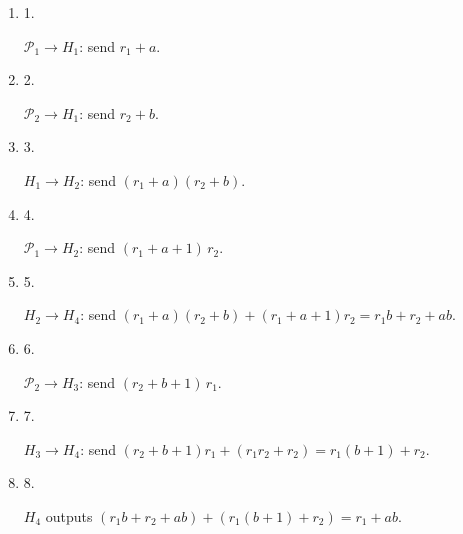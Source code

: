 \begin{enumerate}


\item[] 
1. 


$\mathcal{P}_{1}\rightarrow H_{1}$: send $r_{1}+a$.\par





\item[] 
2. 


$\mathcal{P}_{2}\rightarrow H_{1}$: send $r_{2}+b$.\par





\item[] 
3. 


$H_{1}\rightarrow H_{2}$: send $(r_{1}+a)(r_{2}+b)$.\par





\item[] 
4. 


$\mathcal{P}_{1}\rightarrow H_{2}$: send $(r_{1}+a+1)\,r_{2}$.\par





\item[] 
5. 


$H_{2}\rightarrow H_{4}$: send $(r_{1}+a)(r_{2}+b)+(r_{1}+a+1)r_{2}=r_{1}b+r_{2}+ab$.\par





\item[] 
6. 


$\mathcal{P}_{2}\rightarrow H_{3}$: send $(r_{2}+b+1)\,r_{1}$.\par





\item[] 
7. 


$H_{3}\rightarrow H_{4}$: send $(r_{2}+b+1)r_{1}+(r_{1}r_{2}+r_{2})=r_{1}(b+1)+r_{2}$.\par





\item[] 
8. 


$H_{4}$ outputs $(r_{1}b+r_{2}+ab)+(r_{1}(b+1)+r_{2})=r_{1}+ab$.\par





\end{enumerate}


